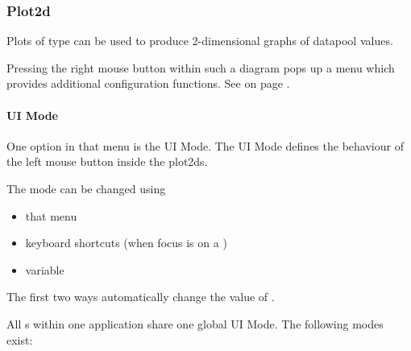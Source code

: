 \subsubsection{Plot2d}
\label{sec:uiplot2d}
Plots of type \PLOTTWOD{} can be used to produce 2-dimensional graphs of datapool values.



Pressing the right mouse button within such a diagram pops up a menu which
provides additional configuration functions.
See  on page \pageref{dia:uiplot2dmenuentrylist}.

\paragraph{UI Mode}
\label{par:uiplot2duimode}
One option in that menu is the UI Mode. The UI Mode defines the behaviour
of the left mouse button inside the plot2ds.

The mode can be changed using
\begin{itemize}
  \item that menu
  \item keyboard shortcuts (when focus is on a \PLOTTWOD)
  \item \DATAPOOL{} variable \PLOTTWODUIMODE
\end{itemize}

The first two ways automatically change the value of \PLOTTWODUIMODE{}.

All \PLOTTWOD{}s within one application share one global UI Mode.
The following modes exist:

